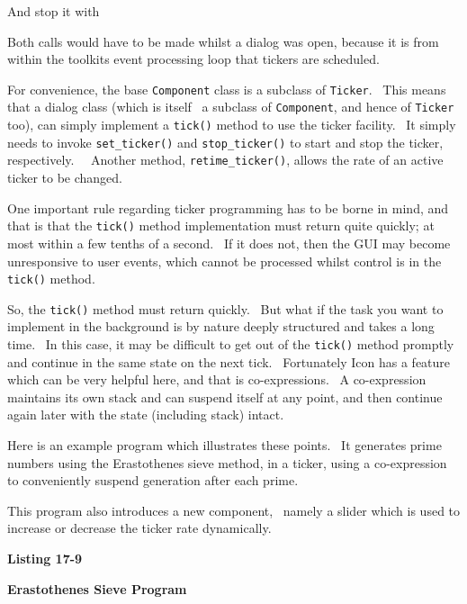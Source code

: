 
And stop it with


Both calls would have to be made whilst a dialog was open, because it is
from within the toolkit{\textquotesingle}s event processing loop that
tickers are scheduled.

For convenience, the base \texttt{Component} class is a subclass of
\texttt{Ticker}. \ This means that a dialog class (which is itself \ a
subclass of \texttt{Component}, and hence of \texttt{Ticker} too), can
simply implement a \texttt{tick()} method to use the ticker facility.
\ It simply needs to invoke \texttt{set\_ticker()} and
\texttt{stop\_ticker()} to start and stop the ticker, respectively.
\ \ Another method, \texttt{retime\_ticker()}, allows the rate of an
active ticker to be changed.

One important rule regarding ticker programming has to be borne in mind,
and that is that the \texttt{tick()} method implementation must return
quite quickly; at most within a few tenths of a second. \ If it does
not, then the GUI may become unresponsive to user events, which cannot
be processed whilst control is in the \texttt{tick()} method.

So, the \texttt{tick()} method must return quickly. \ But what if the
task you want to implement in the background is by nature deeply
structured and takes a long time. \ In this case, it may be difficult
to get out of the \texttt{tick()} method promptly and continue in the
same state on the next tick. \ Fortunately Icon has a feature which can
be very helpful here, and that is co-expressions. \ A co-expression
maintains its own stack and can suspend itself at any point, and then
continue again later with the state (including stack) intact.

Here is an example program which illustrates these points. \ It
generates prime numbers using the Erastothenes{\textquotesingle} sieve
method, in a ticker, using a co-expression to conveniently suspend
generation after each prime.

This program also introduces a new component, \ namely a slider which is
used to increase or decrease the ticker rate dynamically.

{\sffamily\bfseries
Listing 17-9}

{\sffamily\bfseries
Erastothenes{\textquotesingle} Sieve Program}

